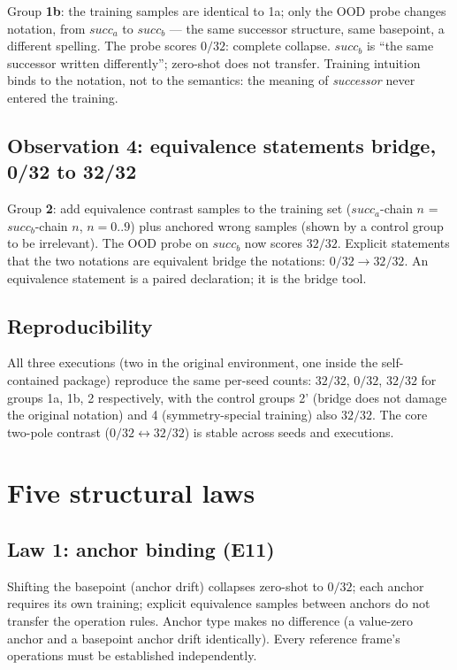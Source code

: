 \documentclass[sigplan,10pt,anonymous,review]{acmart}
\begin{document}
Group \textbf{1b}: the training samples are identical to 1a; only the
OOD probe changes notation, from $\mathit{succ}_a$ to $\mathit{succ}_b$
--- the same successor structure, same basepoint, a different spelling.
The probe scores $0/32$: complete collapse. $\mathit{succ}_b$ is
``the same successor written differently''; zero-shot does not
transfer. Training intuition binds to the notation, not to the
semantics: the meaning of \emph{successor} never entered the training.

\subsection{Observation 4: equivalence statements bridge, 0/32 to 32/32}

Group \textbf{2}: add equivalence contrast samples to the training set
($\mathit{succ}_a$-chain $n$ = $\mathit{succ}_b$-chain $n$, $n =
0..9$) plus anchored wrong samples (shown by a control group to be
irrelevant). The OOD probe on $\mathit{succ}_b$ now scores $32/32$.
Explicit statements that the two notations are equivalent bridge the
notations: $0/32 \to 32/32$. An equivalence statement is a paired
declaration; it is the bridge tool.

\subsection{Reproducibility}

All three executions (two in the original environment, one inside the
self-contained package) reproduce the same per-seed counts: $32/32$,
$0/32$, $32/32$ for groups 1a, 1b, 2 respectively, with the control
groups 2' (bridge does not damage the original notation) and 4
(symmetry-special training) also $32/32$. The core two-pole contrast
($0/32 \leftrightarrow 32/32$) is stable across seeds and executions.

\section{Five structural laws}

\subsection{Law 1: anchor binding (E11)}

Shifting the basepoint (anchor drift) collapses zero-shot to $0/32$;
each anchor requires its own training; explicit equivalence samples
between anchors do not transfer the operation rules. Anchor type makes
no difference (a value-zero anchor and a basepoint anchor drift
identically). Every reference frame's operations must be established
independently.
\end{document}
